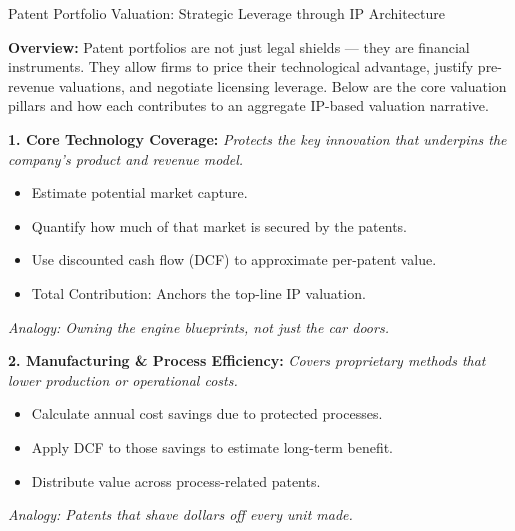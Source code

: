 \medskip

\begin{TechnicalSidebar}{Patent Portfolio Valuation: Strategic Leverage through IP Architecture}

    \textbf{Overview:}  
    Patent portfolios are not just legal shields — they are financial instruments. They allow firms to price 
    their technological advantage, justify pre-revenue valuations, and negotiate licensing leverage. Below 
    are the core valuation pillars and how each contributes to an aggregate IP-based valuation narrative.
    
    \medskip
    
    \textbf{1. Core Technology Coverage:}  
    \textit{Protects the key innovation that underpins the company’s product and revenue model.}

    \medskip

    \begin{itemize}
      \item Estimate potential market capture.
      \item Quantify how much of that market is secured by the patents.
      \item Use discounted cash flow (DCF) to approximate per-patent value.
      \item Total Contribution: Anchors the top-line IP valuation.
    \end{itemize}

    \medskip


    \textit{Analogy: Owning the engine blueprints, not just the car doors.}
    
    \medskip
    
    \textbf{2. Manufacturing \& Process Efficiency:}  
    \textit{Covers proprietary methods that lower production or operational costs.}

    \medskip
    \begin{itemize}
      \item Calculate annual cost savings due to protected processes.
      \item Apply DCF to those savings to estimate long-term benefit.
      \item Distribute value across process-related patents.
    \end{itemize}

    \medskip

    \textit{Analogy: Patents that shave dollars off every unit made.}
    
    \medskip
    

\end{TechnicalSidebar}
